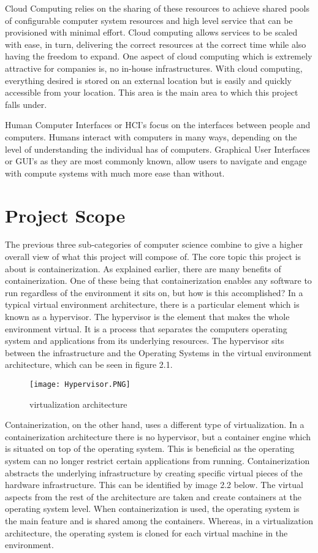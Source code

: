 Cloud Computing relies on the sharing of these resources to achieve shared pools of configurable computer system resources and high level service that can be provisioned with minimal effort. Cloud computing allows services to be scaled with ease, in turn, delivering the correct resources at the correct time while also having the freedom to expand. One aspect of cloud computing which is extremely attractive for companies is, no in-house infrastructures. With cloud computing, everything desired is stored on an external location but is easily and quickly accessible from your location. This area is the main area to which this project falls under.

Human Computer Interfaces or HCI's focus on the interfaces between people and computers. Humans interact with computers in many ways, depending on the level of understanding the individual has of computers. Graphical User Interfaces or GUI's as they are most commonly known, allow users to navigate and engage with compute systems with much more ease than without. 

\section{Project Scope}
The previous three sub-categories of computer science combine to give a higher overall view of what this project will compose of. The core topic this project is about is containerization. As explained earlier, there are many benefits of containerization. One of these being that containerization enables any software to run regardless of the environment it sits on, but how is this accomplished? In a typical virtual environment architecture, there is a particular element which is known as a hypervisor. The hypervisor is the element that makes the whole environment virtual. It is a process that separates the computers operating system and applications from its underlying resources. The hypervisor sits between the infrastructure and the Operating Systems in the virtual environment architecture, which can be seen in figure 2.1.
\begin{figure}[ht]
  \centering
      \texttt{[image: Hypervisor.PNG]}
  \caption[virtualization architecture]{virtualization architecture}
  \label{fig:virtualization architecture}
\end{figure}

\pagebreak Containerization, on the other hand, uses a different type of virtualization. In a containerization architecture there is no hypervisor, but a container engine which is situated on top of the operating system. This is beneficial as the operating system can no longer restrict certain applications from running. Containerization abstracts the underlying infrastructure by creating specific virtual pieces of the hardware infrastructure. This can be identified by image 2.2 below. The virtual aspects from the rest of the architecture are taken and create containers at the operating system level. When containerization is used, the operating system is the main feature and is shared among the containers. Whereas, in a virtualization architecture, the operating system is cloned for each virtual machine in the environment.

